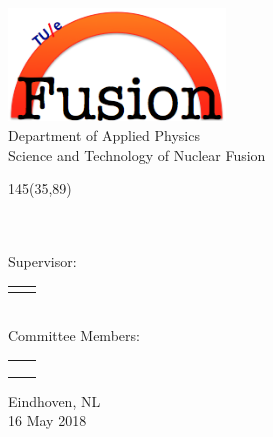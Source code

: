 \begin{titlepage}
\begin{center}
\includegraphics[height=3cm]{../Graphics/tue_fusion_logo}\\
\large
Department of Applied Physics  \\
Science and Technology of Nuclear Fusion

\vspace*{10cm}

\setlength{\TPHorizModule}{1mm}
\setlength{\TPVertModule}{\TPHorizModule}
\newlength{\backupparindent}
\setlength{\backupparindent}{\parindent}
\setlength{\parindent}{0mm}			
\begin{textblock}{145}(35,89)
	\vspace*{1mm}
	\huge
	\textbf{\doctitle \\}
	\Large
	\vspace*{8mm}
	\textit{\docsubtitle}\\
	\vspace*{15mm}
	\Large
	\me\\
\end{textblock}

\large
Supervisor:\\
\begin{tabular}{rl}
	\firstCommitteeMember\\
\end{tabular}
\\ \vspace*{5mm}
Committee Members:\\\vspace*{2mm}
\begin{tabular}{rl}
	\secondCommitteeMember\\
	\thirdCommitteeMember\\
	\fourthCommitteeMember\\
\end{tabular}


\vfill
\large
Eindhoven, NL\\
16 May 2018\\

\setlength{\parindent}{\backupparindent}
\end{center}
\end{titlepage}

